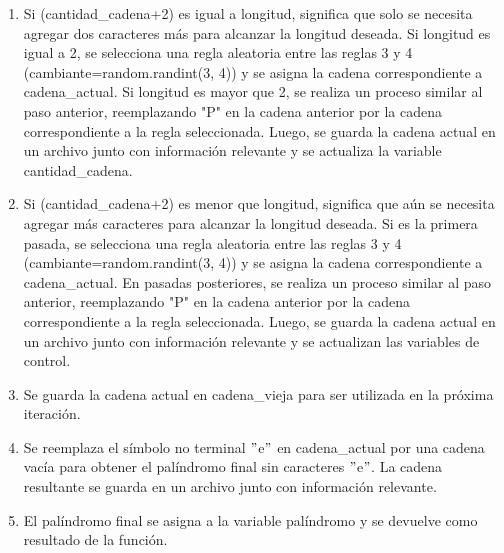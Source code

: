 \begin{enumerate}
\item Si (cantidad\_cadena+2) es igual a longitud, significa que solo se necesita agregar dos caracteres más para alcanzar la longitud deseada. Si longitud es igual a 2, se selecciona una regla aleatoria entre las reglas 3 y 4 (cambiante=random.randint(3, 4)) y se asigna la cadena correspondiente a cadena\_actual. Si longitud es mayor que 2, se realiza un proceso similar al paso anterior, reemplazando "P" en la cadena anterior por la cadena correspondiente a la regla seleccionada. Luego, se guarda la cadena actual en un archivo junto con información relevante y se actualiza la variable cantidad\_cadena.\newline

\item Si (cantidad\_cadena+2) es menor que longitud, significa que aún se necesita agregar más caracteres para alcanzar la longitud deseada. Si es la primera pasada, se selecciona una regla aleatoria entre las reglas 3 y 4 (cambiante=random.randint(3, 4)) y se asigna la cadena correspondiente a cadena\_actual. En pasadas posteriores, se realiza un proceso similar al paso anterior, reemplazando "P" en la cadena anterior por la cadena correspondiente a la regla seleccionada. Luego, se guarda la cadena actual en un archivo junto con información relevante y se actualizan las variables de control.\newline

\item Se guarda la cadena actual en cadena\_vieja para ser utilizada en la próxima iteración.\newline

\item Se reemplaza el símbolo no terminal $"$e$"$ en cadena\_actual por una cadena vacía para obtener el palíndromo final sin caracteres $"$e$"$. La cadena resultante se guarda en un archivo junto con información relevante.\newline

\item El palíndromo final se asigna a la variable palíndromo y se devuelve como resultado de la función.\newline
\end{enumerate}

